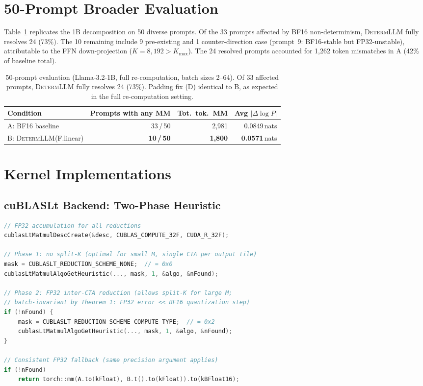\documentclass{article}
\newcommand{\dllm}{\textsc{DetermLLM}\xspace}
\begin{document}
\section{50-Prompt Broader Evaluation}
\label{app:50p}

Table~\ref{tab:decomp_50p} replicates the 1B decomposition on 50 diverse prompts.
Of the 33 prompts affected by BF16 non-determinism, \dllm fully resolves 24 (73\%).
The 10 remaining include 9 pre-existing and 1 counter-direction case (prompt~9: BF16-stable but FP32-unstable), attributable to the FFN down-projection ($K\!=\!8{,}192 > K_{\max}$).
The 24 resolved prompts accounted for 1,262 token mismatches in A (42\% of baseline total).

\begin{table}[h]
\centering
\caption{50-prompt evaluation (Llama-3.2-1B, full re-computation, batch sizes 2--64).
  Of 33 affected prompts, \dllm fully resolves 24 (73\%).  Padding fix (D) identical to B,
  as expected in the full re-computation setting.}
\label{tab:decomp_50p}
\begin{tabular}{lrrr}
\toprule
Condition & Prompts with any MM & Tot.\ tok.\ MM & Avg $|\Delta\log P|$ \\
\midrule
A: BF16 baseline        & 33\,/\,50 & 2{,}981 & 0.0849\,nats \\
B: \dllm (F.linear)     & \textbf{10\,/\,50} & \textbf{1{,}800} & \textbf{0.0571}\,nats \\
\bottomrule
\end{tabular}
\end{table}

\section{Kernel Implementations}
\label{app:kernel}

\subsection{cuBLASLt Backend: Two-Phase Heuristic}

\begin{lstlisting}[language=C++, caption={\texttt{gemm\_fixed\_algo.cu}.}]
// FP32 accumulation for all reductions
cublasLtMatmulDescCreate(&desc, CUBLAS_COMPUTE_32F, CUDA_R_32F);

// Phase 1: no split-K (optimal for small M, single CTA per output tile)
mask = CUBLASLT_REDUCTION_SCHEME_NONE;  // = 0x0
cublasLtMatmulAlgoGetHeuristic(..., mask, 1, &algo, &nFound);

// Phase 2: FP32 inter-CTA reduction (allows split-K for large M;
// batch-invariant by Theorem 1: FP32 error << BF16 quantization step)
if (!nFound) {
    mask = CUBLASLT_REDUCTION_SCHEME_COMPUTE_TYPE;  // = 0x2
    cublasLtMatmulAlgoGetHeuristic(..., mask, 1, &algo, &nFound);
}

// Consistent FP32 fallback (same precision argument applies)
if (!nFound)
    return torch::mm(A.to(kFloat), B.t().to(kFloat)).to(kBFloat16);
\end{lstlisting}
\end{document}

